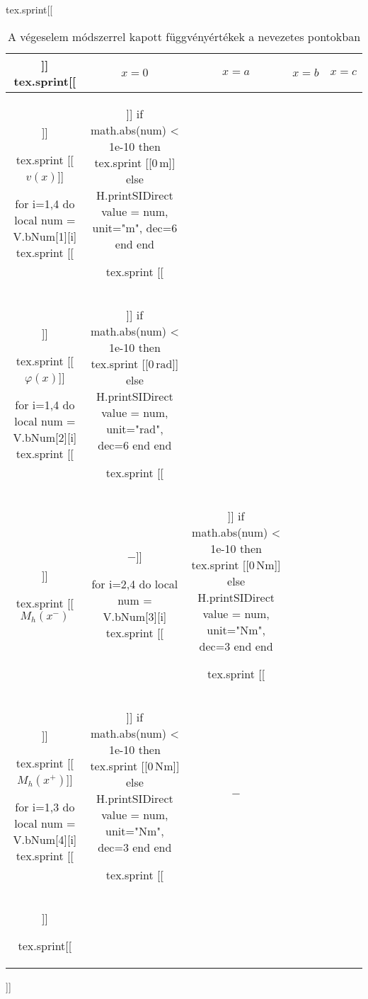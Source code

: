 \begin{table}[H]
\centering
\caption{A végeselem módszerrel kapott függvényértékek a nevezetes pontokban}
\sifix{}
\def\arraystretch{1.25}
\begin{luacode*}
  tex.sprint[[\begin{tabular}{c|c|c|c|c|}]]
  tex.sprint[[& $x = 0$ & $x = a$ & $x = b$ & $x = c$ \\\hline]]

  tex.sprint [[$v(x)$]]

  for i=1,4 do
    local num = V.bNum[1][i]
    tex.sprint [[&]]
    if math.abs(num) < 1e-10 then
      tex.sprint [[$0\,\mathrm{m}$]]
    else
      H.printSIDirect { value = num, unit="m", dec=6 }
    end
  end

  tex.sprint [[\\]]

  tex.sprint [[$\varphi(x)$]]

  for i=1,4 do
    local num = V.bNum[2][i]
    tex.sprint [[&]]
    if math.abs(num) < 1e-10 then
      tex.sprint [[$0\,\mathrm{rad}$]]
    else
      H.printSIDirect { value = num, unit="rad", dec=6 }
    end
  end

  tex.sprint [[\\]]

  tex.sprint [[$M_h(x^-)$ & $-$]]

  for i=2,4 do
    local num = V.bNum[3][i]
    tex.sprint [[&]]
    if math.abs(num) < 1e-10 then
      tex.sprint [[$0\,\mathrm{Nm}$]]
    else
      H.printSIDirect { value = num, unit="Nm", dec=3 }
    end
  end

  tex.sprint [[\\]]

  tex.sprint [[$M_h(x^+)$]]

  for i=1,3 do
    local num = V.bNum[4][i]
    tex.sprint [[&]]
    if math.abs(num) < 1e-10 then
      tex.sprint [[$0\,\mathrm{Nm}$]]
    else
      H.printSIDirect { value = num, unit="Nm", dec=3 }
    end
  end

  tex.sprint [[&$-$\\\hline]]

  tex.sprint[[\end{tabular}]]
\end{luacode*}
\end{table}
